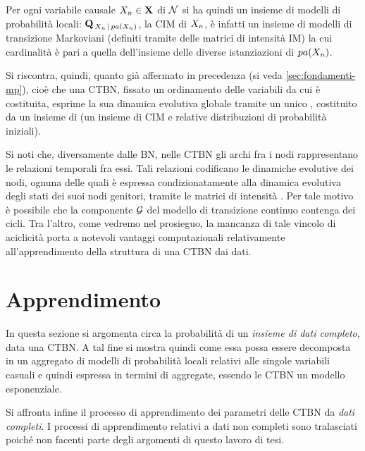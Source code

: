 Per ogni variabile causale $\mathnormal{X_n} \in \mathbf{X}$ di $\mathcal{N}$ si ha quindi un insieme di modelli di probabilità locali: $\mathbf{Q}_{\,\mathnormal{X_n}\,\arrowvert\,pa(\mathnormal{X_n})}$, la \acs{CIM} di $\mathnormal{X_n}$, è infatti un insieme di modelli di transizione Markoviani (definiti tramite delle matrici di intensità \acs{IM}) la cui cardinalità è pari a quella dell'insieme delle diverse istanziazioni di $pa(\mathnormal{X_n})$.

Si riscontra, quindi, quanto già affermato in precedenza (si veda \ref{sec:fondamenti-mp}), cioè che una \acs{CTBN}, fissato un ordinamento delle variabili da cui è costituita, esprime la sua dinamica evolutiva globale tramite un unico \mprocess*{} \omog*{}, costituito da un insieme di \mprocess{} \cond{} (un insieme di \acs{CIM} e relative distribuzioni di probabilità iniziali).

Si noti che, diversamente dalle \acl{BN}, nelle \acl{CTBN} gli archi fra i nodi rappresentano le relazioni temporali fra essi. Tali relazioni codificano le dinamiche evolutive dei nodi, ognuna delle quali è espressa condizionatamente alla dinamica evolutiva degli stati dei suoi nodi genitori, tramite le matrici di intensità \cond*{}. Per tale motivo è possibile che la componente $\mathcal{G}$ del modello di transizione continuo contenga dei cicli. Tra l'altro, come vedremo nel prosieguo, la mancanza di tale vincolo di aciclicità porta a notevoli vantaggi computazionali relativamente all'apprendimento della struttura di una \acs{CTBN} dai dati.

\section{Apprendimento}
\label{sec:ctbn-apprendimento}
In questa sezione si argomenta circa la probabilità di un \emph{insieme di dati completo}, data una \acl{CTBN}. A tal fine si mostra quindi come essa possa essere decomposta in un aggregato di modelli di probabilità locali relativi alle singole variabili casuali e quindi espressa in termini di \emph{\stats{}} aggregate, essendo le \acs{CTBN} un modello esponenziale.

Si affronta infine il processo di apprendimento dei parametri delle \acl{CTBN} da \emph{dati completi}. I processi di apprendimento relativi a dati non completi sono tralasciati poiché non facenti parte degli argomenti di questo lavoro di tesi.

